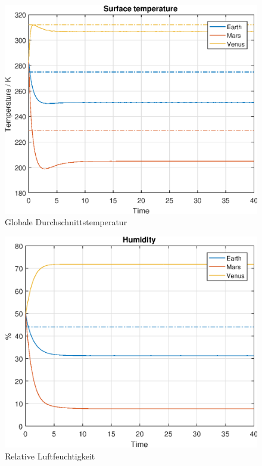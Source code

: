 \begin{refsection}
		\begin{figure}
			\center
			\includegraphics[height=0.45\textheight]{Matlab/figures/surfaceTemperature.eps}
			\caption{Globale Durchschnittstemperatur}
		\end{figure}
		
		\begin{figure}
			\center
			\includegraphics[height=0.45\textheight]{Matlab/figures/humidity.eps}
			\caption{Relative Luftfeuchtigkeit}
		\end{figure}
		

\end{refsection}
